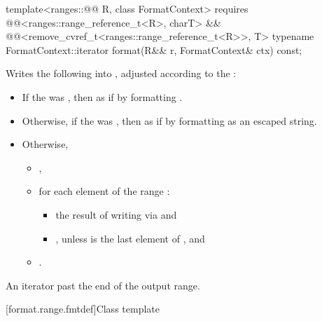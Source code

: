 %
\begin{itemdecl}
template<ranges::@@ R, class FormatContext>
    requires @@<ranges::range_reference_t<R>, charT> &&
             @@<remove_cvref_t<ranges::range_reference_t<R>>, T>
  typename FormatContext::iterator
    format(R&& r, FormatContext& ctx) const;
\end{itemdecl}

\begin{itemdescr}
\pnum
\effects
Writes the following into ,
adjusted according to the :

\begin{itemize}
\item
If the  was ,
then as if by formatting .
\item
Otherwise, if the  was ,
then as if by formatting 
as an escaped string.
\item
Otherwise,
\begin{itemize}
\item
{},
\item
for each element  of the range :
\begin{itemize}
\item
the result of writing  via  and
\item
{}, unless  is the last element of , and
\end{itemize}
\item
{}.
\end{itemize}
\end{itemize}

\pnum
\returns
An iterator past the end of the output range.
\end{itemdescr}

[format.range.fmtdef]{Class template }


